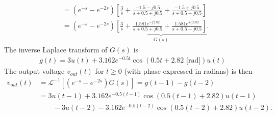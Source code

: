 \documentclass{report}
\begin{document}
\begin{solution}
\begin{align*}
        &= (e^{-s}-e^{-2s})\left[\frac{3}{s} + \frac{-1.5-j0.5}{s+0.5+j0.5} + \frac{-1.5+j0.5}{s+0.5-j0.5}\right] \\
        &= (e^{-s}-e^{-2s})\underbrace{\left[\frac{3}{s} + \frac{1.581e^{-j2.82}}{s+0.5+j0.5} + \frac{1.581e^{+j2.82}}{s+0.5-j0.5}\right]}_{G(s)}.
    \end{align*}
    The inverse Laplace transform of $G(s)$ is 
    \begin{align*}
        g(t) = 3u(t) + 3.162e^{-0.5t}\cos(0.5t+2.82\text{ [rad]})u(t)
    \end{align*}
    The output voltage $v_{out}(t)$ for $t\geq 0$ (with phase expressed in radians) is then 
    \begin{align*}
        v_{out}(t) &= \mathcal{L}^{-1}[(e^{-s}-e^{-2s})G(s)] = g(t-1) - g(t-2) \\ 
        &= 3u(t-1) + 3.162e^{-0.5(t-1)}\cos(0.5(t-1)+2.82)u(t-1) \\ 
        &\qquad - 3u(t-2) - 3.162e^{-0.5(t-2)}\cos(0.5(t-2)+2.82)u(t-2).
    \end{align*}
\end{solution}

\pagebreak
\end{document}
